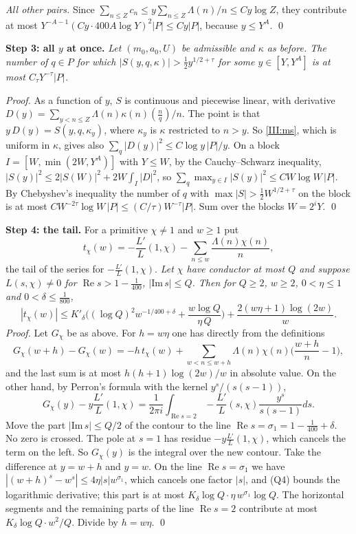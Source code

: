\documentclass[11pt,letterpaper]{article}
\newcommand{\re}{\operatorname{Re}}
\begin{document}
\emph{All other pairs.} Since $\sum_{n\le Z}c_n\le y\sum_{n\le Z}\Lambda(n)/n\le Cy\log Z$, they contribute at
most $Y^{-A-1}(Cy\cdot400A\log Y)^2|P|\le Cy|P|$, because $y\le Y^A$. \qed

\textbf{Step 3: all $y$ at once.} \emph{Let $(m_0,a_0,U)$ be admissible and $\kappa$ as before. The number of
$q\in P$ for which $|S(y,q,\kappa)|>\frac12y^{1/2+\tau}$ for some $y\in[Y,Y^A]$ is at most $C_\tau Y^{-\tau}|P|$.}

\noindent\emph{Proof.} As a function of $y$, $S$ is continuous and piecewise linear, with derivative
$D(y)=\sum_{y<n\le Z}\Lambda(n)\kappa(n)(\frac nq)/n$. The point is that $y\,D(y)=S(y,q,\kappa_y)$, where
$\kappa_y$ is $\kappa$ restricted to $n>y$. So \eqref{III:ms}, which is uniform in $\kappa$, gives also
$\sum_q|D(y)|^2\le C\log y\,|P|/y$. On a block $I=[W,\min(2W,Y^A)]$ with $Y\le W$, by the Cauchy--Schwarz inequality,
$|S(y)|^2\le2|S(W)|^2+2W\int_I|D|^2$, so
$\sum_q\max_{y\in I}|S(y)|^2\le CW\log W\,|P|$. By Chebyshev's inequality the number of $q$ with
$\max|S|>\frac12W^{1/2+\tau}$ on the block is at most $CW^{-2\tau}\log W\,|P|\le(C/\tau)W^{-\tau}|P|$. Sum
over the blocks $W=2^iY$. \qed

\textbf{Step 4: the tail.} For a primitive $\chi\ne1$ and $w\ge1$ put
\begin{equation}\label{D:124}
 t_\chi(w)=-\frac{L'}L(1,\chi)-\sum_{n\le w}\frac{\Lambda(n)\chi(n)}n ,
\end{equation}
the tail of the series for $-\frac{L'}L(1,\chi)$. \emph{Let $\chi$ have conductor at most $Q$ and suppose
$L(s,\chi)\ne0$ for $\re s>1-\frac1{400}$, $|\mathrm{Im}\,s|\le Q$. Then for $Q\ge2$, $w\ge2$, $0<\eta\le1$ and
$0<\delta\le\frac1{800}$,}
\begin{equation}\label{III:tail}
 |t_\chi(w)|\le K'_\delta\Big((\log Q)^2w^{-1/400+\delta}+\frac{w\log Q}{\eta\,Q}\Big)+\frac{2(w\eta+1)\log(2w)}{w}.
\end{equation}
\emph{Proof.} Let $G_\chi$ be as above. For $h=w\eta$ one has directly from the definitions
\begin{equation}\label{D:126}
 G_\chi(w+h)-G_\chi(w)=-h\,t_\chi(w)+\sum_{w<n\le w+h}\Lambda(n)\chi(n)\Big(\frac{w+h}n-1\Big),
\end{equation}
and the last sum is at most $h(h+1)\log(2w)/w$ in absolute value. On the other hand, by Perron's formula
with the kernel $y^s/(s(s-1))$,
\begin{equation}\label{D:127}
 G_\chi(y)-y\frac{L'}L(1,\chi)=\frac1{2\pi i}\int_{\re s=2}-\frac{L'}L(s,\chi)\frac{y^s}{s(s-1)}ds .
\end{equation}
Move the part $|\mathrm{Im}\,s|\le Q/2$ of the contour to the line $\re s=\sigma_1=1-\frac1{400}+\delta$. No
zero is crossed. The pole at $s=1$ has residue $-y\frac{L'}L(1,\chi)$, which cancels the term on the left.
So $G_\chi(y)$ is the integral over the new contour. Take the difference at $y=w+h$ and $y=w$. On the line
$\re s=\sigma_1$ we have $|(w+h)^s-w^s|\le4\eta|s|w^{\sigma_1}$, which cancels one factor $|s|$, and (Q4)
bounds the logarithmic derivative; this part is at most $K_\delta\log Q\cdot\eta\,w^{\sigma_1}\log Q$. The
horizontal segments and the remaining parts of the line $\re s=2$ contribute at most $K_\delta\log Q\cdot w^2/Q$.
Divide by $h=w\eta$. \qed
\end{document}
